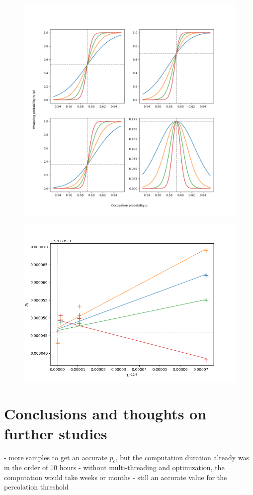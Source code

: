 \begin{figure}
	\centering
		\includegraphics[width=\linewidth]{../plots/plot1}
		\caption{\label{fig:plot1} }
\end{figure}

\begin{figure}
	\centering
		\includegraphics[width=\linewidth]{../plots/plot2}
		\caption{\label{fig:plot2} }
\end{figure}

\section{Conclusions and thoughts on further studies}
- more samples to get an accurate $p_c$, but the computation duration already was in the order of 10 hours
- without multi-threading and optimization, the computation would take weeks or months
- still an accurate value for the percolation threshold










